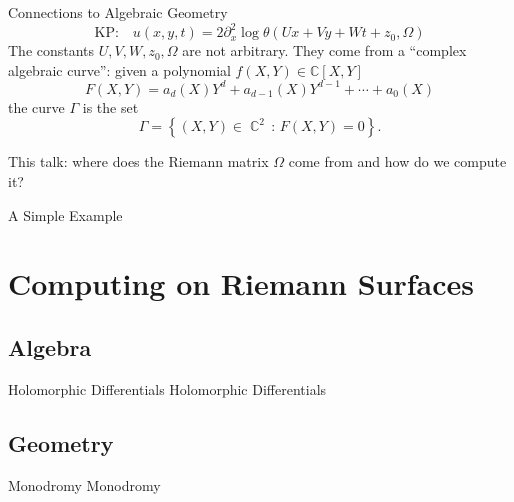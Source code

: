 \documentclass {beamer}
\DeclareMathOperator{\CC}{\mathbb{C}}
\begin{document}
\begin{frame}{Connections to Algebraic Geometry}{}
  \[
    \text{KP:} \quad u(x,y,t) = 2 \partial_x^2 \log
    \theta(Ux + Vy + Wt + z_0, \Omega)
  \]
  The constants $U,V,W,z_0,\Omega$ are not arbitrary. They come from a
  ``complex algebraic curve'': given a polynomial $f(X,Y) \in
  \mathbb{C}[X,Y]$
  \[
  F(X,Y) = a_d(X)Y^d + a_{d-1}(X)Y^{d-1} + \cdots + a_0(X)
  \]
  the curve $\Gamma$ is the set
  \[
  \Gamma = \left\{ (X,Y) \in \CC^2 \, : \, F(X,Y) = 0 \right\}.
  \]

  \begin{block}
  {This talk: where does the Riemann matrix $\Omega$ come from and how
    do we compute it?}
  \end{block}
\end{frame}

\begin{frame}{A Simple Example}{}
\end{frame}



\section{Computing on Riemann Surfaces}

\subsection{Algebra}

\begin{frame}{Holomorphic Differentials}{}
  Holomorphic Differentials
\end{frame}

\subsection{Geometry}

\begin{frame}{Monodromy}{}
  Monodromy
\end{frame}
\end{document}
